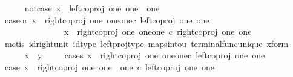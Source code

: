 \begin{isabellebody}
\isanewline
\ \ \ \ \isamarkupfalse%
\ not{\isacharunderscore}{\kern0pt}case{}{\isacharcolon}{\kern0pt}\ {\isachardoublequoteopen}x\ {\isasymnoteq}\ left{\isacharunderscore}{\kern0pt}coproj\ one\ {\isacharparenleft}{\kern0pt}one\ {\isasymCoprod}\ one{\isacharparenright}{\kern0pt}{\isachardoublequoteclose}\isanewline
\ \ \ \ \isamarkupfalse%
\ \isamarkupfalse%
\ case{}{\isacharunderscore}{\kern0pt}or{\isacharunderscore}{\kern0pt}{}{\isacharcolon}{\kern0pt}\ {\isachardoublequoteopen}x\ {\isacharequal}{\kern0pt}\ right{\isacharunderscore}{\kern0pt}coproj\ one\ {\isacharparenleft}{\kern0pt}one{\isasymCoprod}one{\isacharparenright}{\kern0pt}{\isasymcirc}\isactrlsub c\ left{\isacharunderscore}{\kern0pt}coproj\ one\ one\ {\isasymor}\ \isanewline
\ \ \ \ \ \ \ \ \ \ \ \ \ \ \ x\ {\isacharequal}{\kern0pt}\ right{\isacharunderscore}{\kern0pt}coproj\ one\ {\isacharparenleft}{\kern0pt}one{\isasymCoprod}one{\isacharparenright}{\kern0pt}\ {\isasymcirc}\isactrlsub c\ right{\isacharunderscore}{\kern0pt}coproj\ one\ one{\isachardoublequoteclose}\isanewline
\ \ \ \ \ \ \isamarkupfalse%
\ {\isacharparenleft}{\kern0pt}metis\ id{\isacharunderscore}{\kern0pt}right{\isacharunderscore}{\kern0pt}unit{}\ id{\isacharunderscore}{\kern0pt}type\ left{\isacharunderscore}{\kern0pt}proj{\isacharunderscore}{\kern0pt}type\ maps{\isacharunderscore}{\kern0pt}into{\isacharunderscore}{\kern0pt}{}u{}\ terminal{\isacharunderscore}{\kern0pt}func{\isacharunderscore}{\kern0pt}unique\ x{\isacharunderscore}{\kern0pt}form{\isacharparenright}{\kern0pt}\isanewline
\ \ \ \ \isamarkupfalse%
\ {\isachardoublequoteopen}x\ {\isacharequal}{\kern0pt}\ y{\isachardoublequoteclose}\isanewline
\ \ \ \ \isamarkupfalse%
{\isacharparenleft}{\kern0pt}cases\ {\isachardoublequoteopen}x\ {\isacharequal}{\kern0pt}\ right{\isacharunderscore}{\kern0pt}coproj\ one\ {\isacharparenleft}{\kern0pt}one{\isasymCoprod}one{\isacharparenright}{\kern0pt}{\isasymcirc}\isactrlsub c\ left{\isacharunderscore}{\kern0pt}coproj\ one\ one{\isachardoublequoteclose}{\isacharparenright}{\kern0pt}\isanewline
\ \ \ \ \ \ \isamarkupfalse%
\ case{}{\isacharcolon}{\kern0pt}\ {\isachardoublequoteopen}x\ {\isacharequal}{\kern0pt}\ right{\isacharunderscore}{\kern0pt}coproj\ one\ {\isacharparenleft}{\kern0pt}one\ {\isasymCoprod}\ one{\isacharparenright}{\kern0pt}\ {\isasymcirc}\isactrlsub c\ left{\isacharunderscore}{\kern0pt}coproj\ one\ one{\isachardoublequoteclose}\isanewline

\end{isabellebody}
